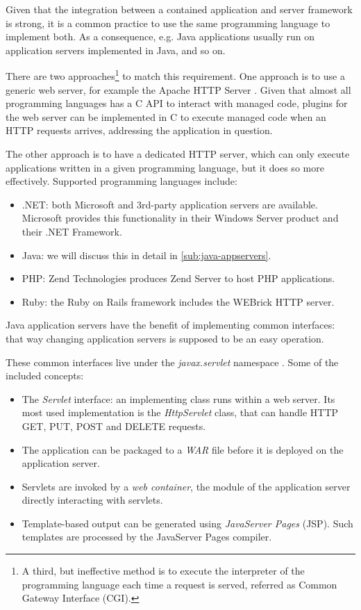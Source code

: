 Given that the integration between a contained application and server framework
is strong, it is a common practice to use the same programming language to
implement both. As a consequence, e.g. Java applications usually run on
application servers implemented in Java, and so on.

There are two approaches\footnote{A third, but ineffective method is to
execute the interpreter of the programming language each time a request is
served, referred as Common Gateway Interface (CGI).} to match this requirement.
One approach is to use a generic web server, for example the Apache HTTP
Server \cite{apache-httpd}. Given that almost all programming languages has a C
API to interact with managed code, plugins for the web server can be
implemented in C to execute managed code when an HTTP requests arrives,
addressing the application in question.

The other approach is to have a dedicated HTTP server, which can only execute
applications written in a given programming language, but it does so more
effectively. Supported programming languages include:

\begin{itemize}
\item .NET: both Microsoft and 3rd-party application servers are available.
Microsoft provides this functionality in their Windows Server product and their
.NET Framework.
\item Java: we will discuss this in detail in \autoref{sub:java-appservers}.
\item PHP: Zend Technologies produces Zend Server to host PHP applications.
\item Ruby: the Ruby on Rails framework includes the WEBrick HTTP server.
\end{itemize}

\label{sub:java-appservers}

Java application servers have the benefit of implementing common interfaces:
that way changing application servers is supposed to be an easy operation.

These common interfaces live under the \emph{javax.servlet} namespace \cite{javax-servlet}.
Some of the included concepts:

\begin{itemize}
\item The \emph{Servlet} interface: an implementing class runs within a web
server. Its most used implementation is the \emph{HttpServlet} class, that can
handle HTTP GET, PUT, POST and DELETE requests.
\item The application can be packaged to a \emph{WAR} file before it is deployed
on the application server.
\item Servlets are invoked by a \emph{web container}, the module of the
application server directly interacting with servlets.
\item Template-based output can be generated using \emph{JavaServer Pages}
(JSP). Such templates are processed by the JavaServer Pages compiler.
\end{itemize}

